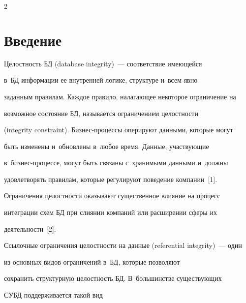 












\thispagestyle{headings}



\begin{multicols}{2}



\label{st\stat}



\section{Введение}



  Целостность БД (database integrity)~--- соответствие имеющейся

в~БД информации ее внутренней логике, структуре и~всем явно

заданным правилам. Каждое правило, налагающее некоторое ограничение на

возможное состояние БД, называется ограничением це\-лост\-ности

(integrity constraint). Биз\-нес-про\-цес\-сы оперируют данными, которые могут

быть изменены и~обновлены в~любое время. Данные, участвующие

  в~биз\-нес-про\-цессе, могут быть связаны с~хранимыми данными и~должны

удовлетворять правилам, которые регулируют поведение компании~[1].

Ограничения целостности оказывают существенное влияние на процесс

интеграции схем БД при слиянии компаний или расширении сферы их

деятельности~[2].



  Ссылочные ограничения целостности на данные (referential integrity)~--- один

из основных видов ограничений в~БД, которые позволяют

сохранить структурную целостность БД. В~большинстве существующих

СУБД поддерживается такой вид


\end{multicols}
